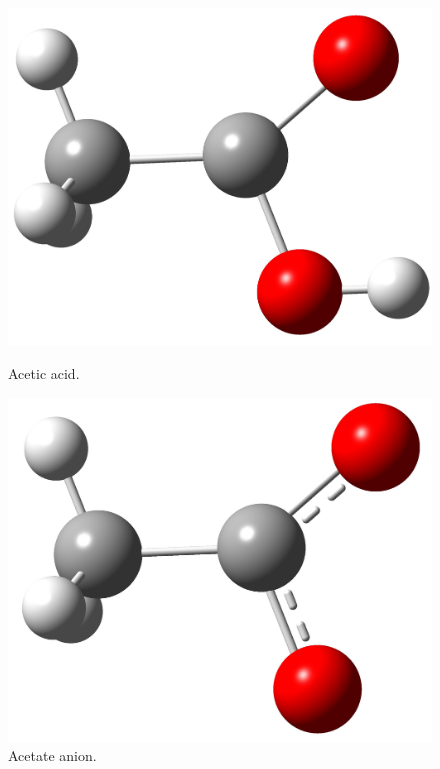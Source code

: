 \documentclass[twocolumn]{article}
\begin{document}
\begin{figure}[h!]
        \begin{minipage}[b]{0.225\textwidth}
            \centering
          \includegraphics[scale=0.07]{aceticAcid.jpg}
          \caption{Acetic acid.}
        \end{minipage}
        \hfill
        \begin{minipage}[b]{0.225\textwidth}
          \centering
          \includegraphics[scale=0.08]{acetate.jpg}
          \caption{Acetate anion.}
        \end{minipage}
        \centering
        \begin{minipage}[b]{0.225\textwidth}

\end{minipage}
\end{figure}
\end{document}
